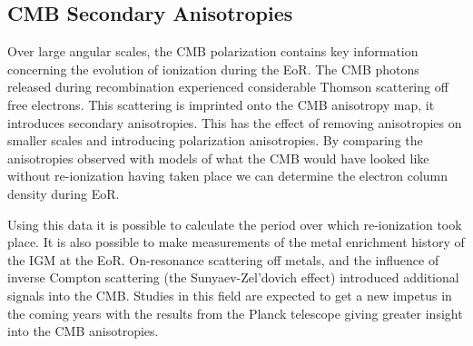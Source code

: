 
\subsection{CMB Secondary Anisotropies} %
\label{sub:cmb_secondary_anisotropies}
	Over large angular scales, the CMB polarization contains key information concerning the evolution of ionization during the EoR. The CMB photons released during recombination experienced considerable Thomson scattering off free electrons. This scattering is imprinted onto the CMB anisotropy map, it introduces secondary anisotropies. This has the effect of removing anisotropies on smaller scales and introducing polarization anisotropies. By comparing the anisotropies observed with models of what the CMB would have looked like without re-ionization having taken place we can determine the electron column density during EoR.

	Using this data it is possible to calculate the period over which re-ionization took place. It is also possible to make measurements of the metal enrichment history of the IGM at the EoR. On-resonance scattering off metals, and the influence of inverse Compton scattering (the Sunyaev-Zel'dovich effect) introduced additional signals into the CMB\cite{Monteagudo2006}. Studies in this field are expected to get a new impetus in the coming years with the results from the Planck telescope giving greater insight into the CMB anisotropies.
